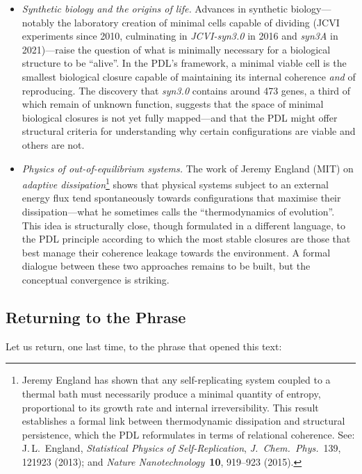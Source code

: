 \documentclass[12pt, a4paper, openright]{book}
\begin{document}
\begin{itemize}
\item \textit{Synthetic biology and the origins of life.} Advances in synthetic biology---notably the laboratory creation of minimal cells capable of dividing (JCVI experiments since 2010, culminating in \textit{JCVI-syn3.0} in 2016 and \textit{syn3A} in 2021)---raise the question of what is minimally necessary for a biological structure to be ``alive''. In the PDL's framework, a minimal viable cell is the smallest biological closure capable of maintaining its internal coherence \emph{and} of reproducing. The discovery that \textit{syn3.0} contains around 473 genes, a third of which remain of unknown function, suggests that the space of minimal biological closures is not yet fully mapped---and that the PDL might offer structural criteria for understanding why certain configurations are viable and others are not.

\item \textit{Physics of out-of-equilibrium systems.} The work of Jeremy England (MIT) on \emph{adaptive dissipation}\footnote{Jeremy England has shown that any self-replicating system coupled to a thermal bath must necessarily produce a minimal quantity of entropy, proportional to its growth rate and internal irreversibility. This result establishes a formal link between thermodynamic dissipation and structural persistence, which the PDL reformulates in terms of relational coherence. See: J.\,L.~England, \textit{Statistical Physics of Self-Replication}, \textit{J.~Chem.~Phys.}~139, 121923 (2013); and \textit{Nature Nanotechnology}~\textbf{10}, 919--923 (2015).} shows that physical systems subject to an external energy flux tend spontaneously towards configurations that maximise their dissipation---what he sometimes calls the ``thermodynamics of evolution''. This idea is structurally close, though formulated in a different language, to the PDL principle according to which the most stable closures are those that best manage their coherence leakage towards the environment. A formal dialogue between these two approaches remains to be built, but the conceptual convergence is striking.

\end{itemize}

\subsection*{Returning to the Phrase}

Let us return, one last time, to the phrase that opened this text:
\end{document}
